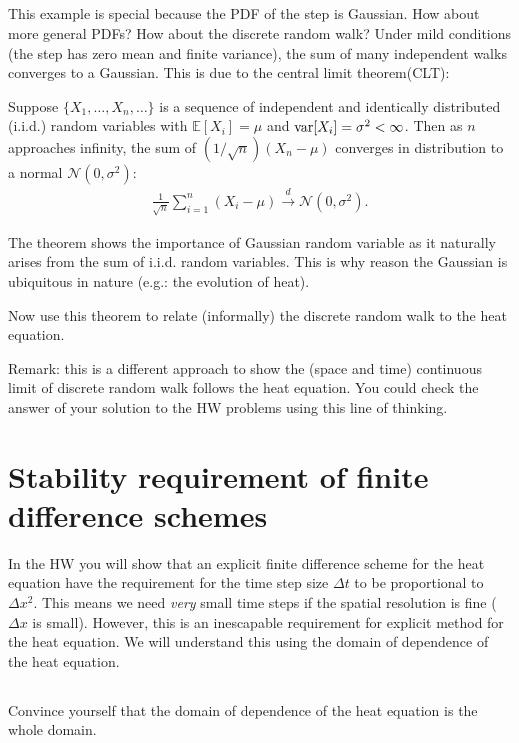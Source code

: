 \documentclass[11pt,letterpaper]{report}
\begin{document}
\subsection{}
This example is special because the PDF of the step is Gaussian. How about more general PDFs? How about the discrete random walk? Under mild conditions (the step has zero mean and finite variance), the sum of many independent walks converges to a Gaussian. This is due to the central limit theorem(CLT):
\begin{displayquote}
    Suppose $\{X_{1},\ldots ,X_{n},\ldots \}$ is a sequence of independent and identically distributed (i.i.d.) random variables with $\mathbb {E} [X_{i}]=\mu$ and $\text{var}[X_{i}]=\sigma ^{2}<\infty$. Then as $n$ approaches infinity, the sum of $(1/\sqrt {n}) (X_n-\mu)$ converges in distribution to a normal $\mathcal {N}(0,\sigma ^{2})$:
    \begin{align}
        \frac{1}{\sqrt{n}}\sum_{i=1}^n (X_i-\mu) \xrightarrow{d} \mathcal {N}(0,\sigma ^{2}).
    \end{align}
\end{displayquote}
The theorem shows the importance of Gaussian random variable as it naturally arises from the sum of i.i.d. random variables. This is why reason the Gaussian is ubiquitous in nature (e.g.: the evolution of heat). 

Now use this theorem to relate (informally) the discrete random walk to the heat equation.

Remark: this is a different approach to show the (space and time) continuous limit of discrete random walk follows the heat equation. You could check the answer of your solution to the HW problems using this line of thinking.

\section{Stability requirement of finite difference schemes}
In the HW you will show that an explicit finite difference scheme for the heat equation have the requirement for the time step size $\Delta t$ to be proportional to $\Delta x^2$. This means we need \emph{very} small time steps if the spatial resolution is fine ($\Delta x$ is small). However, this is an inescapable requirement for explicit method for the heat equation. We will understand this using the domain of dependence of the heat equation.

\subsection{}
Convince yourself that the domain of dependence of the heat equation is the whole domain.
\end{document}

